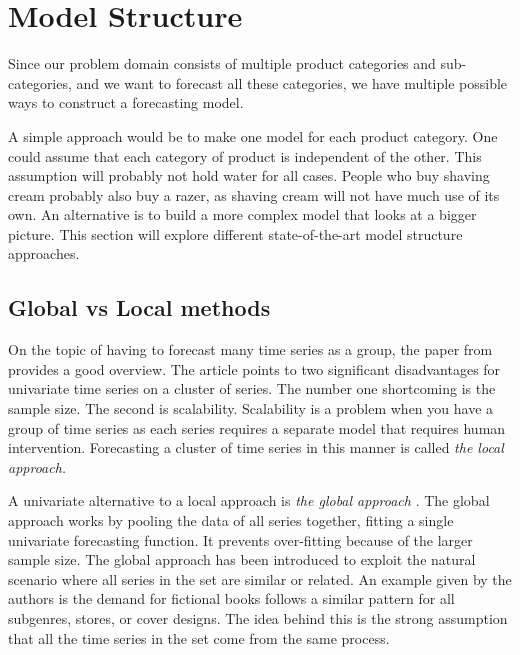 \section{Model Structure}
\label{section:RelatedWork:Model-structure}
Since our problem domain consists of multiple product categories and sub-categories,
and we want to forecast all these categories,
we have multiple possible ways to construct a forecasting model.

A simple approach would be to make one model for each product category.
One could assume that each category of product is independent of the other.
This assumption will probably not hold water for all cases. People who buy shaving cream probably also buy a razer, as shaving cream will not have much use of its own.
An alternative is to build a more complex model that looks at a bigger picture.
This section will explore different state-of-the-art model structure approaches.




\subsection{Global vs Local methods}
On the topic of having to forecast many time series as a group, the paper from \cite{Montero-Manso2021} provides a good overview.
The article points to two significant disadvantages for univariate time series on a cluster of series.
The number one shortcoming is the sample size. The second is scalability.
Scalability is a problem when you have a group of time series as each series requires a separate model
that requires human intervention. Forecasting a cluster of time series in this manner is called
\textit{the local approach.}

A univariate alternative to a local approach is \textit{the global approach}
\citep{Rabanser2020}.
The global approach works by pooling the data of all series together, fitting a single univariate forecasting function. It prevents over-fitting because of the larger sample size.
The global approach has been introduced to exploit the natural scenario where all series
in the set are similar or related. An example given by the authors is the demand for fictional
books follows a similar pattern for all subgenres, stores, or cover designs.
The idea behind this is the strong assumption that all the time series in the set
come from the same process.

